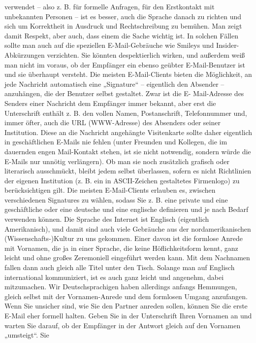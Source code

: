 \documentclass[]{book}
\theoremstyle{definition}
\theoremstyle{definition}
\theoremstyle{definition}
\theoremstyle{remark}
\begin{document}
verwendet -- also z. B. für formelle Anfragen, für den Erstkontakt mit
unbekannten Personen -- ist es besser, auch die Sprache danach zu
richten und sich um Korrektheit in Ausdruck und Rechtschreibung zu
bemühen. Man zeigt damit Respekt, aber auch, dass einem die Sache
wichtig ist. In solchen Fällen sollte man auch auf die speziellen
E-Mail-Gebräuche wie Smileys und Insider-Abkürzungen verzichten. Sie
könnten despektierlich wirken, und außerdem weiß man nicht im voraus, ob
der Empfänger ein ebenso geübter E-Mail-Benutzer ist und sie überhaupt
versteht. Die meisten E-Mail-Clients bieten die Möglichkeit, an jede
Nachricht automatisch eine „Signature`` -- eigentlich den Absender --
anzuhängen, die der Benutzer selbst gestaltet. Zwar ist die E-
Mail-Adresse des Senders einer Nachricht dem Empfänger immer bekannt,
aber erst die Unterschrift enthält z. B. den vollen Namen,
Postanschrift, Telefonnummer und, immer öfter, auch die URL
(WWW-Adresse) des Absenders oder seiner Institution. Diese an die
Nachricht angehängte Visitenkarte sollte daher eigentlich in
geschäftlichen E-Mails nie fehlen (unter Freunden und Kollegen, die im
dauernden engen Mail-Kontakt stehen, ist sie nicht notwendig, sondern
würde die E-Mails nur unnötig verlängern). Ob man sie noch zusätzlich
grafisch oder literarisch ausschmückt, bleibt jedem selbst überlassen,
sofern es nicht Richtlinien der eigenen Institution (z. B. ein in
ASCII-Zeichen gestaltetes Firmenlogo) zu berücksichtigen gilt. Die
meisten E-Mail-Clients erlauben es, zwischen verschiedenen Signatures zu
wählen, sodass Sie z. B. eine private und eine geschäftliche oder eine
deutsche und eine englische definieren und je nach Bedarf verwenden
können. Die Sprache des Internet ist Englisch (eigentlich Amerikanisch),
und damit sind auch viele Gebräuche aus der nordamerikanischen
(Wissenschafts-)Kultur zu uns gekommen. Einer davon ist die formlose
Anrede mit Vornamen, die ja in einer Sprache, die keine Höflichkeitsform
kennt, ganz leicht und ohne großes Zeremoniell eingeführt werden kann.
Mit dem Nachnamen fallen dann auch gleich alle Titel unter den Tisch.
Solange man auf Englisch international kommuniziert, ist es auch ganz
leicht und angenehm, dabei mitzumachen. Wir Deutschsprachigen haben
allerdings anfangs Hemmungen, gleich selbst mit der Vornamen-Anrede und
dem formlosen Umgang anzufangen. Wenn Sie unsicher sind, wie Sie den
Partner anreden sollen, können Sie die erste E-Mail eher formell halten.
Geben Sie in der Unterschrift Ihren Vornamen an und warten Sie darauf,
ob der Empfänger in der Antwort gleich auf den Vornamen „umsteigt``. Sie
\end{document}
